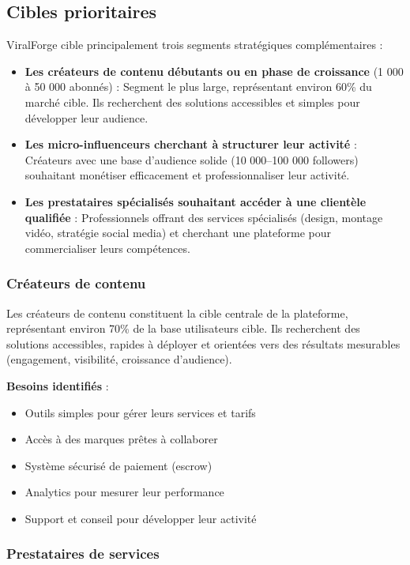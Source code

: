 \subsection{Cibles prioritaires}

ViralForge cible principalement trois segments stratégiques complémentaires :

\begin{itemize}
    \item \textbf{Les créateurs de contenu débutants ou en phase de croissance} (1 000 à 50 000 abonnés) : Segment le plus large, représentant environ 60\% du marché cible. Ils recherchent des solutions accessibles et simples pour développer leur audience.
    \item \textbf{Les micro-influenceurs cherchant à structurer leur activité} : Créateurs avec une base d'audience solide (10 000–100 000 followers) souhaitant monétiser efficacement et professionnaliser leur activité.
    \item \textbf{Les prestataires spécialisés souhaitant accéder à une clientèle qualifiée} : Professionnels offrant des services spécialisés (design, montage vidéo, stratégie social media) et cherchant une plateforme pour commercialiser leurs compétences.
\end{itemize}

\subsubsection{Créateurs de contenu}

Les créateurs de contenu constituent la cible centrale de la plateforme, représentant environ 70\% de la base utilisateurs cible. Ils recherchent des solutions accessibles, rapides à déployer et orientées vers des résultats mesurables (engagement, visibilité, croissance d'audience).

\textbf{Besoins identifiés} :
\begin{itemize}
    \item Outils simples pour gérer leurs services et tarifs
    \item Accès à des marques prêtes à collaborer
    \item Système sécurisé de paiement (escrow)
    \item Analytics pour mesurer leur performance
    \item Support et conseil pour développer leur activité
\end{itemize}

\subsubsection{Prestataires de services}

